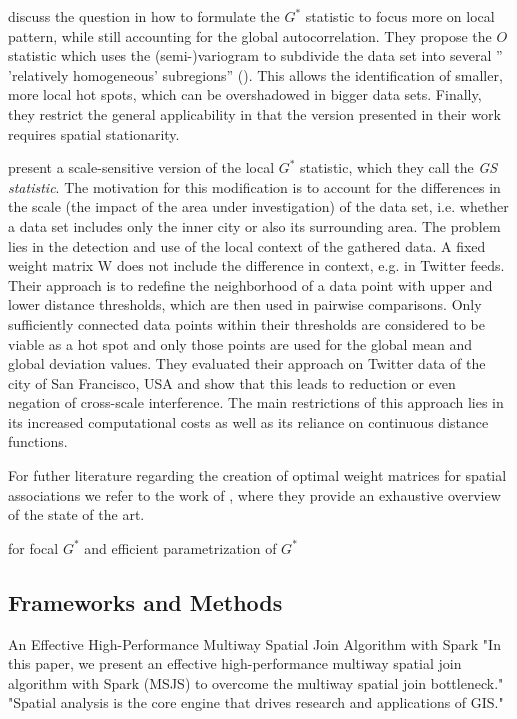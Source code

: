 \documentclass[a4paper,UKenglish]{lipics-v2016}
\begin{document}
\cite{ord2001testing} discuss the question in how to formulate the $G^*$ statistic to focus more on local pattern, while still accounting for the global autocorrelation. They propose the $O$ statistic which uses the (semi-)variogram to subdivide the data set into several '' 'relatively homogeneous' subregions'' (\cite{ord2001testing}). This allows the identification of smaller, more local hot spots, which can be overshadowed in bigger data sets. Finally, they restrict the general applicability in that the version presented in their work requires spatial stationarity.

\cite{westerholt2015local} present a scale-sensitive version of the local $G^*$ statistic, which they call the \emph{GS statistic}. The motivation for this modification is to account for the differences in the scale (the impact of the area under investigation) of the data set, i.e. whether a data set includes only the inner city or also its surrounding area. The problem lies in the detection and use of the local context of the gathered data. A fixed weight matrix W does not include the difference in context, e.g. in Twitter feeds. Their approach is to redefine the neighborhood of a data point with upper and lower distance thresholds, which are then used in pairwise comparisons. Only sufficiently connected data points within their thresholds are considered to be viable as a hot spot and only those points are used for the global mean and global deviation values. They evaluated their approach on Twitter data of the city of San Francisco, USA and show that this leads to reduction or even negation of cross-scale interference. The main restrictions of this approach lies in its increased computational costs as well as its reliance on continuous distance functions.


For futher literature regarding the creation of optimal weight matrices for spatial associations we refer to the work of \cite{aldstadt2006using}, where they provide an exhaustive overview of the state of the art.

\cite{Bruns2017} for focal $G^*$ and efficient parametrization of $G^*$

\subsection{Frameworks and Methods}
An Effective High-Performance Multiway Spatial Join Algorithm with Spark \cite{ijgi6040096}
"In this paper, we present an effective
high-performance multiway spatial join algorithm with Spark (MSJS) to overcome the multiway
spatial join bottleneck." "Spatial analysis is the core engine that drives research and applications of GIS."
\end{document}
